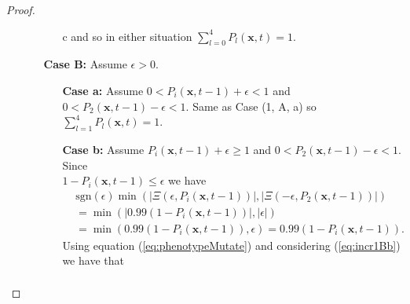 \documentclass[\main/thesis.tex]{subfiles}
\begin{document}
\begin{proof}
\begin{itemize}
\begin{itemize}
\begin{itemize}
                           	                        c and so in either situation 
                           	                        $\sum_{l{=}0}^4 P_l(\boldsymbol{x}, t) {=} 1$.
                             \end{itemize}
                             \item[{\bf Case B:}] Assume $\epsilon {>} 0$.
                             \begin{itemize}
                             	\item[{\bf Case a:}] Assume $0 {<} P_i(\boldsymbol{x}, t{-}1) {+} \epsilon {<} 1$ 
                             	                     and $0 {<} P_2(\boldsymbol{x}, t{-}1) {-} \epsilon {<} 1$. 
                             	                     Same as Case (1, A, a) so $\sum_{l{=}1}^4 P_l(\boldsymbol{x}, t) {=} 1$.
                             	\item[{\bf Case b:}] Assume $P_i(\boldsymbol{x}, t{-}1) {+} \epsilon {\ge} 1$ 
                             	                     and $0 {<} P_2(\boldsymbol{x}, t{-}1) {-} \epsilon {<} 1$. Since\\
                             	                     $1 {-} P_i(\boldsymbol{x}, t{-}1) {\le} \epsilon$ we have 
                             	                     \begin{align*}
                             	                       &\text{sgn}(\epsilon) \min(|\Xi(\epsilon,P_i(\boldsymbol{x},t{-}1))|, 
                             	                                                  |\Xi({-}\epsilon, 
                             	                                                       P_2(\boldsymbol{x},t{-}1))|) \\ 
                             	                       &{=} \min(|0.99 (1{-}P_i(\boldsymbol{x}, t{-}1))|, |\epsilon|) \\
                                             	       &{=} \min(0.99 (1{-}P_i(\boldsymbol{x}, t{-}1)), \epsilon) 
                            	                        {=} 0.99 (1 {-} P_i(\boldsymbol{x}, t{-}1)).
                             	                       \tag{11}
                             	                       \label{eq:incr1Bb}
                             	                     \end{align*}
                             	                     Using equation (\ref{eq:phenotypeMutate}) and considering 
                             	                     (\ref{eq:incr1Bb}) we have that
                             	                     \begin{align*}

\end{align*}
\end{itemize}
\end{itemize}
\end{itemize}
\end{proof}
\end{document}
